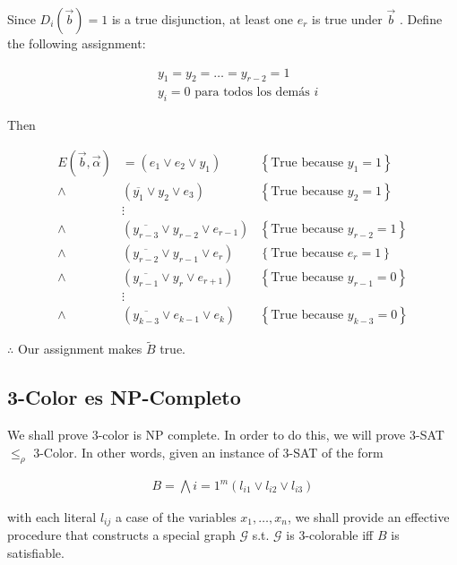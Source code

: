 \documentclass[a4paper]{article}
\begin{document}
Since $D_i(\overrightarrow{b}) = 1$ is a true disjunction, at least one $e_r$
is true under $\overrightarrow{b}$ . Define the following assignment:

\begin{align*}
    &y_1 = y_2 = \ldots = y_{r-2} = 1 \\ 
    &y_i = 0 \text{ para todos los demás $i$}
\end{align*}

Then

\begin{align*}
    E(\overrightarrow{b}, \overrightarrow{\alpha}) &= \left( e_1 \lor e_2 \lor y_1 \right) &\left\{ \text{True because } y_1 = 1 \right\}  \\ 
    \land &\left( \overline{y_1} \lor  y_2 \lor  e_3 \right) &\left\{ \text{True because } y_2 = 1 \right\}  \\ 
          &\vdots& \\ 
    \land &(\overline{y_{r-3}} \lor  y_{r-2} \lor  e_{r-1}) &\left\{ \text{True because } y_{r-2} = 1 \right\}  \\ 
    \land&(\overline{y_{r-2}} \lor  y_{r-1} \lor  e_r) &\left\{ \text{True because } e_{r} = 1 \right\}  \\ 
    \land&(\overline{y_{r-1}} \lor y_{r} \lor  e_{r+1}) &\left\{ \text{True because } y_{r-1} = 0 \right\}  \\ 
         &\vdots &\\ 
    \land &(\overline{y_{k-3}} \lor e_{k-1} \lor  e_k) &\left\{ \text{True because } y_{k-3} = 0 \right\} 
\end{align*}

$\therefore $ Our assignment makes $\tilde{ B }$ true.

\pagebreak 


\subsection{3-Color es NP-Completo}

We shall prove $3$-color is NP complete. In order to do this, we will prove 
$3$-SAT $\leq_{\rho}$ $3$-Color. In other words, given an instance of $3$-SAT 
of the form 

\begin{align*}
    B = \bigwedge{i=1}^{m} (l_{i1} \lor  l_{i2} \lor  l_{i3})
\end{align*}

with each literal $l_{ij}$ a case of the variables $x_1, \ldots, x_n$, we shall
provide an effective procedure that constructs a special graph $\mathcal{G}$
s.t. $\mathcal{G}$ is $3$-colorable iff $B$ is satisfiable.
\end{document}
